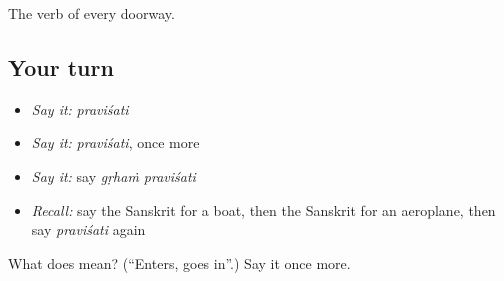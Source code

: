 \begin{grammarlens}[title={What you've built}]
The verb of every doorway.
\end{grammarlens}

\subsection*{Your turn}
\begin{itemize}
\raggedright
  \item \emph{Say it:} \emph{praviśati}
  \item \emph{Say it:} \emph{praviśati}, once more
  \item \emph{Say it:} say \emph{gṛhaṁ praviśati}
  \item \emph{Recall:} say the Sanskrit for a boat, then the Sanskrit for an aeroplane, then say \emph{praviśati} again
\end{itemize}

\begin{tcolorbox}[breakable,colback=teal!4,colframe=teal!35!black,title={Before you move on}]
What does  mean? (\textquotedblleft{}Enters, goes in\textquotedblright{}.) Say it once more.
\end{tcolorbox}
